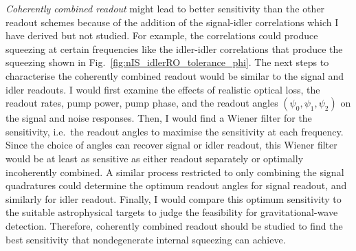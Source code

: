 \emph{Coherently combined readout} might lead to better sensitivity than the other readout schemes because of the addition of the signal-idler correlations which I have derived but not studied. For example, the correlations could produce squeezing at certain frequencies like the idler-idler correlations that produce the squeezing shown in Fig.~\ref{fig:nIS_idlerRO_tolerance_phi}. The next steps to characterise the coherently combined readout would be similar to the signal and idler readouts. I would first examine the effects of realistic optical loss, the readout rates, pump power, pump phase, and the readout angles $(\psi_0,\psi_1,\psi_2)$ on the signal and noise responses. Then, I would find a Wiener filter for the sensitivity, i.e.\ the readout angles to maximise the sensitivity at each frequency. Since the choice of angles can recover signal or idler readout, this Wiener filter would be at least as sensitive as either readout separately or optimally incoherently combined. A similar process restricted to only combining the signal quadratures could determine the optimum readout angles for signal readout, and similarly for idler readout. Finally, I would compare this optimum sensitivity to the suitable astrophysical targets to judge the feasibility for gravitational-wave detection.
Therefore, coherently combined readout should be studied to find the best sensitivity that nondegenerate internal squeezing can achieve.


